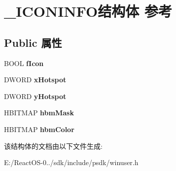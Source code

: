 \hypertarget{struct___i_c_o_n_i_n_f_o}{}\section{\+\_\+\+I\+C\+O\+N\+I\+N\+F\+O结构体 参考}
\label{struct___i_c_o_n_i_n_f_o}
\subsection*{Public 属性}
\begin{DoxyCompactItemize}
\item 
\mbox{\label{struct___i_c_o_n_i_n_f_o_a2440a33ca0d653d20b5317c4736927fd}} 
B\+O\+OL {\bfseries f\+Icon}
\item 
\mbox{\label{struct___i_c_o_n_i_n_f_o_a9f8c55a6e9960fbab4df69366c841214}} 
D\+W\+O\+RD {\bfseries x\+Hotspot}
\item 
\mbox{\label{struct___i_c_o_n_i_n_f_o_a150ba1b62358bc069a2ad68c380c8ba3}} 
D\+W\+O\+RD {\bfseries y\+Hotspot}
\item 
\mbox{\label{struct___i_c_o_n_i_n_f_o_aeb0568b0092d620124e294c082dea3e4}} 
H\+B\+I\+T\+M\+AP {\bfseries hbm\+Mask}
\item 
\mbox{\label{struct___i_c_o_n_i_n_f_o_ad895eac58c4c181b1331b3def8a7c58d}} 
H\+B\+I\+T\+M\+AP {\bfseries hbm\+Color}
\end{DoxyCompactItemize}


该结构体的文档由以下文件生成\+:\begin{DoxyCompactItemize}
\item 
E\+:/\+React\+O\+S-\/0../sdk/include/psdk/winuser.\+h\end{DoxyCompactItemize}
